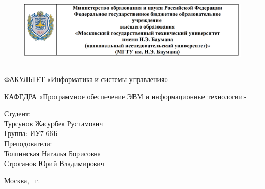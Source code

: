 \documentclass[a4paper, 12pt]{article}
\begin{document}
	
\begin{titlepage}
	\fontsize{12pt}{12pt}\selectfont
	\begin{figure}[t!]
		\centering
		\includegraphics[scale=0.8]{bmstu}
	\end{figure}
	
	\noindent\rule{15cm}{3pt}
	\newline\newline
	\noindent 
	ФАКУЛЬТЕТ 
	\underline{«Информатика и системы управления»} \newline\newline
	
	\noindent КАФЕДРА \underline{«Программное обеспечение ЭВМ и информационные технологии»}\newline\newline\newline\newline\newline
	
	\vspace{4mm}
	
	\vspace{8mm}
	
	
	\begin{flushright}
		{\small	Студент:\\ Турсунов Жасурбек Рустамович \\ Группа: ИУ7-66Б
			\vspace{3mm}
			\\Преподователи: \\ Толпинская Наталья Борисовна \\ Строганов Юрий Владимирович}
	\end{flushright}
	
	\begin{center}
		\vfill
		Москва, \the\year
		~г.
	\end{center}
\end{titlepage}
\end{document}
